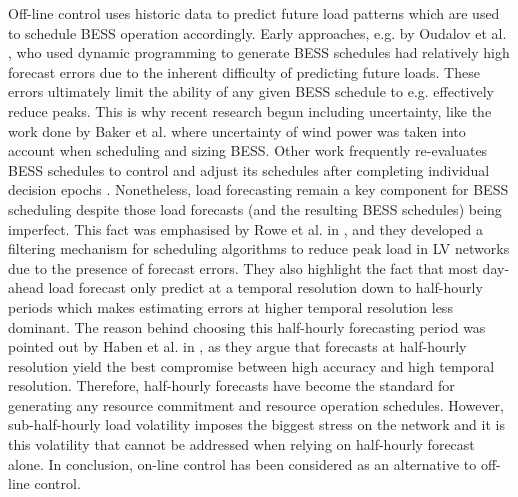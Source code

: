 Off-line control uses historic data to predict future load patterns which are used to schedule BESS operation accordingly.
Early approaches, e.g. by Oudalov et al. \cite{Oudalov2007}, who used dynamic programming to generate BESS schedules had relatively high forecast errors due to the inherent difficulty of predicting future loads.
These errors ultimately limit the ability of any given BESS schedule to e.g. effectively reduce peaks.
This is why recent research begun including uncertainty, like the work done by Baker et al. \cite{Baker2017} where uncertainty of wind power was taken into account when scheduling and sizing BESS.
Other work frequently re-evaluates BESS schedules to control and adjust its schedules after completing individual decision epochs \cite{Wang2014a}.
Nonetheless, load forecasting remain a key component for BESS scheduling despite those load forecasts (and the resulting BESS schedules) being imperfect.
This fact was emphasised by Rowe et al. in \cite{Rowe2014a}, and they developed a filtering mechanism for scheduling algorithms to reduce peak load in LV networks due to the presence of forecast errors.
They also highlight the fact that most day-ahead load forecast only predict at a temporal resolution down to half-hourly periods which makes estimating errors at higher temporal resolution less dominant.
The reason behind choosing this half-hourly forecasting period was pointed out by Haben et al. in \cite{Poghosyan2014, Haben2014}, as they argue that forecasts at half-hourly resolution yield the best compromise between high accuracy and high temporal resolution.
Therefore, half-hourly forecasts have become the standard for generating any resource commitment and resource operation schedules.
However, sub-half-hourly load volatility imposes the biggest stress on the network and it is this volatility that cannot be addressed when relying on half-hourly forecast alone.
In conclusion, on-line control has been considered as an alternative to off-line control.

